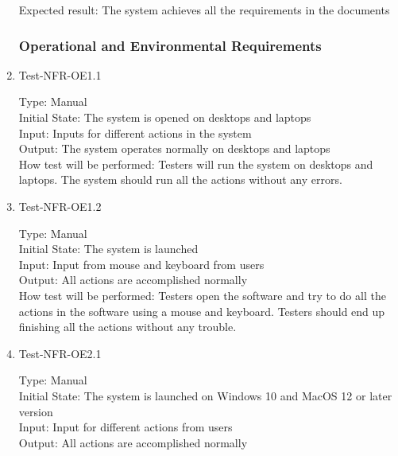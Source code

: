 \documentclass[12pt, titlepage]{article}
\begin{document}
\begin{enumerate}
Expected result: The system achieves all the requirements in the documents

\subsubsection{Operational and Environmental Requirements}
\item{Test-NFR-OE1.1\\}

Type: Manual\\

Initial State: The system is opened on desktops and laptops\\

Input: Inputs for different actions in the system\\

Output: The system operates normally on desktops and laptops\\

How test will be performed: Testers will run the system on desktops and laptops. The system should run all the actions without any errors.

\item{Test-NFR-OE1.2\\}

Type: Manual\\

Initial State: The system is launched\\

Input: Input from mouse and keyboard from users\\

Output: All actions are accomplished normally\\

How test will be performed: Testers open the software and try to do all the actions in the software using a mouse and keyboard. Testers should end up finishing all the actions without any trouble.

\item{Test-NFR-OE2.1\\}

Type: Manual\\

Initial State: The system is launched on Windows 10 and MacOS 12 or later version\\

Input: Input for different actions from users\\

Output: All actions are accomplished normally\\


\end{enumerate}
\end{document}
